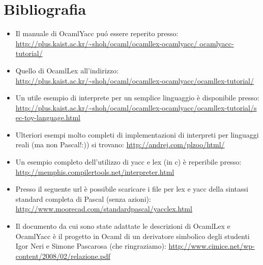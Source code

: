 \documentclass[a4paper,10pt]{article}
\begin{document}
\section*{Bibliografia}
\begin{itemize}
\item Il manuale di OcamlYacc pu\'o essere reperito presso:
\url{http://plus.kaist.ac.kr/~shoh/ocaml/ocamllex-ocamlyacc/
ocamlyacc-tutorial/}
\item Quello di OcamlLex all'indirizzo:
\url{http://plus.kaist.ac.kr/~shoh/ocaml/ocamllex-ocamlyacc/ocamllex-tutorial/}

\item Un utile esempio di interprete per un semplice linguaggio \`e disponibile
presso:
\url{http://plus.kaist.ac.kr/~shoh/ocaml/ocamllex-ocamlyacc/ocamllex-tutorial/s
ec-toy-language.html}
\item Ulteriori esempi molto completi di implementazioni di interpreti per
linguaggi reali (ma non Pascal!:)) si trovano: 
\url{http://andrej.com/plzoo/html/}

\item Un esempio completo dell'utilizzo di yacc e lex (in c) \`e reperibile
presso: 
\url{http://memphis.compilertools.net/interpreter.html}

\item Presso il seguente url \`e possibile scaricare i file per lex e yacc della
sintassi standard completa di Pascal (senza azioni): 
\url{http://www.moorecad.com/standardpascal/yacclex.html}

\item Il documento da cui sono state adattate le descrizioni di OcamlLex e
OcamlYacc \`e il progetto in Ocaml di un derivatore simbolico degli studenti
Igor Neri e Simone Pascarosa (che ringraziamo):
\url{http://www.cimice.net/wp-content/2008/02/relazione.pdf}
\end{itemize}
\end{document}
